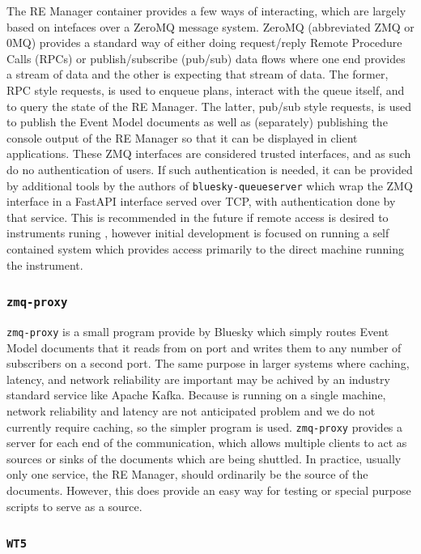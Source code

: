 The RE Manager container provides a few ways of interacting, which are largely based on intefaces over a ZeroMQ\cite{} message system.
ZeroMQ (abbreviated ZMQ or 0MQ) provides a standard way of either doing request/reply Remote Procedure Calls (RPCs) or publish/subscribe (pub/sub) data flows where one end provides a stream of data and the other is expecting that stream of data.
The former, RPC style requests, is used to enqueue plans, interact with the queue itself, and to query the state of the RE Manager.
The latter, pub/sub style requests, is used to publish the Event Model documents as well as (separately) publishing the console output of the RE Manager so that it can be displayed in client applications.
These ZMQ interfaces are considered trusted interfaces, and as such do no authentication of users.
If such authentication is needed, it can be provided by additional tools by the authors of \texttt{bluesky-queueserver} which wrap the ZMQ interface in a FastAPI\cite{} interface served over TCP, with authentication done by that service.
This is recommended in the future if remote access is desired to instruments runing \biab, however initial development is focused on running a self contained system which provides access primarily to the direct machine running the instrument.

\subsubsection{\texttt{zmq-proxy}}

\texttt{zmq-proxy} is a small program provide by Bluesky which simply routes Event Model documents that it reads from on port and writes them to any number of subscribers on a second port.
The same purpose in larger systems where caching, latency, and network reliability are important may be achived by an industry standard service like Apache Kafka\cite{}.
Because \biab is running on a single machine, network reliability and latency are not anticipated problem and we do not currently require caching, so the simpler program is used.
\texttt{zmq-proxy} provides a server for each end of the communication, which allows multiple clients to act as sources or sinks of the documents which are being shuttled.
In practice, usually only one service, the RE Manager, should ordinarily be the source of the documents.
However, this does provide an easy way for testing or special purpose scripts to serve as a source.

\subsubsection{\texttt{WT5}}

